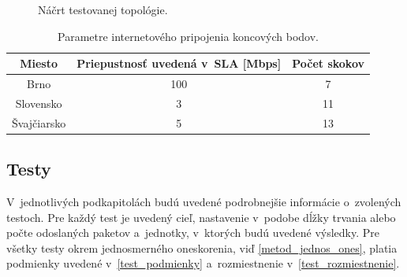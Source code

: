        \begin{figure}[H]
           \begin{center}
                   \caption{Náčrt testovanej topológie.}
               \label{internet}
           \end{center}
       \end{figure}

        \begin{table}[h!]
            \begin{center}
                \begin{tabular}{|c|c|c|}
                    \hline
                    Miesto & Priepustnosť uvedená v~SLA [Mbps] & Počet skokov\\  
                    \hline
                    Brno        & 100 & 7 \\
                    \hline
                    Slovensko   & 3   & 11 \\
                    \hline
                    Švajčiarsko & 5   & 13 \\
                    \hline
                \end{tabular}
                \caption{Parametre internetového pripojenia koncových bodov.} 
                \label{net_parametre}
            \end{center}
        \end{table}

     \subsection{Testy} \label{test_testy}
        V~jednotlivých podkapitolách budú uvedené podrobnejšie informácie
        o~zvolených testoch. Pre každý test je uvedený cieľ, nastavenie v~podobe 
        dĺžky trvania alebo počte odoslaných paketov a~jednotky, v~ktorých budú
        uvedené výsledky. Pre všetky testy okrem jednosmerného oneskorenia, viď
        \ref{metod_jednos_ones}, platia podmienky uvedené
        v~\ref{test_podmienky} a~rozmiestnenie v~\ref{test_rozmiestnenie}. 

